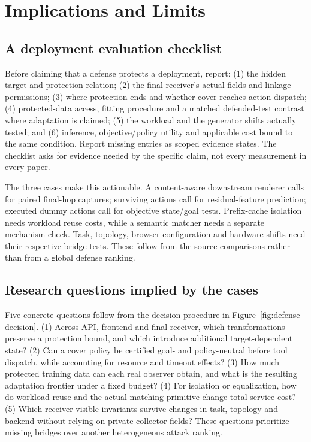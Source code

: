 \section{Implications and Limits}\label{sec:agenda}
\subsection{A deployment evaluation checklist}
Before claiming that a defense protects a deployment, report: (1) the hidden target and protection relation; (2) the final receiver's actual fields and linkage permissions; (3) where protection ends and whether cover reaches action dispatch; (4) protected-data access, fitting procedure and a matched defended-test contrast where adaptation is claimed; (5) the workload and the generator shifts actually tested; and (6) inference, objective/policy utility and applicable cost bound to the same condition. Report missing entries as scoped evidence states. The checklist asks for evidence needed by the specific claim, not every measurement in every paper.

The three cases make this actionable. A content-aware downstream renderer calls for paired final-hop captures; surviving actions call for residual-feature prediction; executed dummy actions call for objective state/goal tests. Prefix-cache isolation needs workload reuse costs, while a semantic matcher needs a separate mechanism check. Task, topology, browser configuration and hardware shifts need their respective bridge tests. These follow from the source comparisons rather than from a global defense ranking.

\subsection{Research questions implied by the cases}
Five concrete questions follow from the decision procedure in Figure~\ref{fig:defense-decision}. (1) Across API, frontend and final receiver, which transformations preserve a protection bound, and which introduce additional target-dependent state? (2) Can a cover policy be certified goal- and policy-neutral before tool dispatch, while accounting for resource and timeout effects? (3) How much protected training data can each real observer obtain, and what is the resulting adaptation frontier under a fixed budget? (4) For isolation or equalization, how do workload reuse and the actual matching primitive change total service cost? (5) Which receiver-visible invariants survive changes in task, topology and backend without relying on private collector fields? These questions prioritize missing bridges over another heterogeneous attack ranking.

